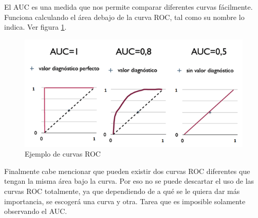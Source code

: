 El \ac{AUC} es una medida que nos permite comparar diferentes curvas fácilmente. Funciona calculando el área debajo de la curva ROC, tal como su nombre lo indica. Ver figura \ref{fig:eg-roc}.

\begin{figure}[htbp]
    \centering
    \includegraphics[width=0.8\linewidth]{graficos/eg_roc.png}
    \caption{Ejemplo de curvas ROC \citep{wiki:roc_figure}}
    \label{fig:eg-roc}
\end{figure}

Finalmente cabe mencionar que pueden existir dos curvas ROC diferentes que tengan la misma área bajo la curva. Por eso no se puede descartar el uso de las curvas ROC totalmente, ya que dependiendo de a qué se le quiera dar más importancia, se escogerá una curva y otra. Tarea que es imposible solamente observando el \ac{AUC}.





